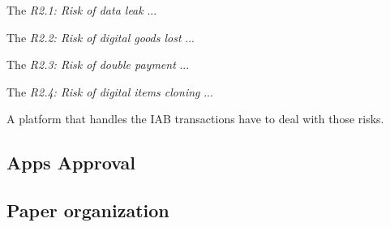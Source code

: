 The {\em R2.1: Risk of data leak} ...

The {\em R2.2: Risk of digital goods lost} ...

The {\em R2.3: Risk of double payment} ...

The {\em R2.4: Risk of digital items cloning} ...

A platform that handles the IAB transactions have to deal with those risks.



\subsection{Apps Approval}




\subsection{Paper organization}


